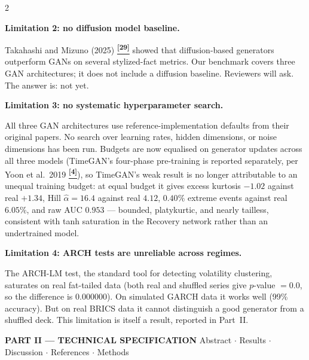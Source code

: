\documentclass[10pt]{article}
\newcommand{\tcite}[1]{%
  \hyperlink{R:#1}{\textsuperscript{\scriptsize\textbf{[#1]}}}}
\begin{document}
\begin{multicols}{2}
{\medskip
\textbf{Limitation 2: no diffusion model baseline.}

Takahashi and Mizuno (2025)\tcite{29} showed that diffusion-based generators outperform GANs on several stylized-fact metrics. Our benchmark covers three GAN architectures; it does not include a diffusion baseline. Reviewers will ask. The answer is: not yet.

\medskip
\textbf{Limitation 3: no systematic hyperparameter search.}

All three GAN architectures use reference-implementation defaults from their original papers. No search over learning rates, hidden dimensions, or noise dimensions has been run. Budgets are now equalised on generator updates across all three models (TimeGAN's four-phase pre-training is reported separately, per Yoon et al.\ 2019\tcite{4}), so TimeGAN's weak result is no longer attributable to an unequal training budget: at equal budget it gives excess kurtosis $-1.02$ against real $+1.34$, Hill $\hat\alpha=16.4$ against real $4.12$, $0.40\%$ extreme events against real $6.05\%$, and raw AUC $0.953$ --- bounded, platykurtic, and nearly tailless, consistent with tanh saturation in the Recovery network rather than an undertrained model.

\medskip
\textbf{Limitation 4: ARCH tests are unreliable across regimes.}

The ARCH-LM test, the standard tool for detecting volatility clustering, saturates on real fat-tailed data (both real and shuffled series give $p$-value $= 0.0$, so the difference is $0.000000$). On simulated GARCH data it works well (99\% accuracy). But on real BRICS data it cannot distinguish a good generator from a shuffled deck. This limitation is itself a result, reported in Part~II.}

\end{multicols}

\clearpage



\begin{tcolorbox}[enhanced,arc=0pt,outer arc=0pt,boxrule=0pt,
  colback=Navy!10,colframe=Navy!10,top=3pt,bottom=3pt,left=8pt,right=8pt,
  before skip=0pt,after skip=6pt]
{\large\bfseries\color{Navy} PART II --- TECHNICAL SPECIFICATION}
\hfill{\small\color{Navy!70} Abstract $\cdot$ Results $\cdot$ Discussion $\cdot$ References $\cdot$ Methods}
\end{tcolorbox}
\end{document}
